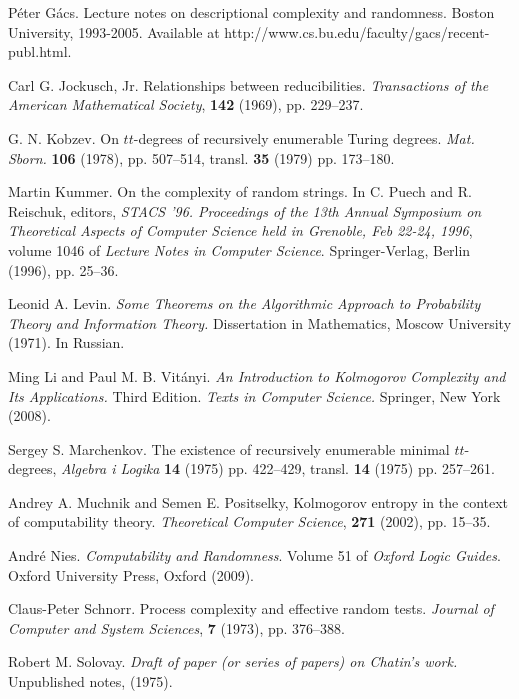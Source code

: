 \documentclass{LMCS}
\newcommand{\0}{\mathbf{0}}
\newcommand{\<}{\langle}
\renewcommand{\>}{\rangle}
\begin{document}
\begin{thebibliography}{99}
  P\'eter G\'acs.
  Lecture notes on descriptional complexity and randomness.
  Boston University, 1993-2005.
  Available at http://www.cs.bu.edu/faculty/gacs/recent-publ.html.

  Carl G. Jockusch, Jr.
  Relationships between reducibilities.
  {\em Transactions of the American Mathematical Society},
  {\bf 142} (1969), pp. 229--237.

  G. N. Kobzev.
  On $tt$-degrees of recursively enumerable Turing degrees.
  {\em Mat. Sborn.} {\bf 106} (1978), pp. 507--514,
  transl. {\bf 35} (1979) pp. 173--180.

  Martin Kummer.
  On the complexity of random strings.
  In C. Puech and R. Reischuk, editors, {\em STACS '96.
  Proceedings of the 13th Annual Symposium on Theoretical Aspects of
  Computer Science held in Grenoble, Feb 22-24, 1996},
  volume 1046 of {\em Lecture Notes in Computer Science}.
  Springer-Verlag, Berlin (1996), pp. 25--36.

  Leonid A. Levin.
  {\em Some Theorems on the Algorithmic Approach to Probability Theory and
  Information Theory.}  Dissertation in Mathematics, Moscow University (1971).
  In Russian.

  Ming Li and Paul M. B. Vit\'anyi.
  {\em An Introduction to {K}olmogorov Complexity and Its Applications.}
  Third Edition.
  {\em Texts in Computer Science.}
  Springer, New York (2008).

  Sergey S. Marchenkov.
  The existence of recursively enumerable minimal $tt$-degrees,
  {\em Algebra i Logika} {\bf 14} (1975) pp. 422--429,
  transl. {\bf 14} (1975) pp. 257--261.

Andrey A. Muchnik and Semen E. Positselky,
  Kolmogorov entropy in the context of computability theory.
  {\em Theoretical Computer Science}, {\bf 271} (2002), pp. 15--35.

  Andr\'e Nies.
  {\em Computability and Randomness}.
  Volume 51 of {\em Oxford Logic Guides}.
  Oxford University Press, Oxford (2009).

  Claus-Peter Schnorr.
  Process complexity and effective random tests.
  {\em Journal of Computer and System Sciences}, {\bf 7} (1973), pp. 376--388.

  Robert M. Solovay.
  {\em Draft of paper (or series of papers) on Chatin's work.}
  Unpublished notes, (1975).

\end{thebibliography}
\end{document}
